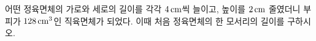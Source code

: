 어떤 정육면체의 가로와 세로의 길이를 각각 $4\mkern3mu \mathrm{cm}$씩 늘이고, 높이를 $2\mkern3mu \mathrm{cm}$ 줄였더니 부피가 $128\mkern3mu \mathrm{cm}^3$인 직육면체가 되었다. 이때 처음 정육면체의 한 모서리의 길이를 구하시오.
